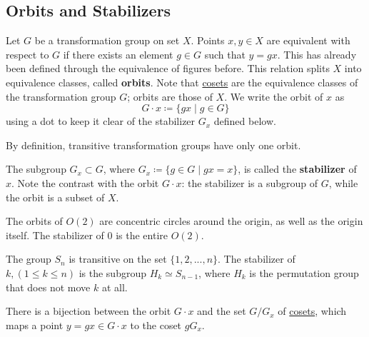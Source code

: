 \subsection{Orbits and Stabilizers}

  \begin{definition}[Orbits]
    \label{def:orbits}
    Let $G$ be a transformation group on set $X$. Points $x, y \in X$ are equivalent with respect to $G$ if there exists an element $g \in G$ such that $y = g x$. This has already been defined through the equivalence of figures before. This relation splits $X$ into equivalence classes, called \textbf{orbits}. Note that \hyperref[def:coset]{cosets} are the equivalence classes of the transformation group $G$; orbits are those of $X$. We write the orbit of $x$ as
    \begin{equation}
      G \cdot x \coloneqq \{ g x \;|\; g \in G \}
    \end{equation}
    using a dot to keep it clear of the stabilizer $G_x$ defined below.
  \end{definition}

  By definition, transitive transformation groups have only one orbit.

  \begin{definition}[Stabilizer]
    \label{def:stabilizer}
    The subgroup $G_{x} \subset G$, where $G_{x} \coloneqq \{ g \in G \mid g x = x\}$, is called the \textbf{stabilizer} of $x$. Note the contrast with the orbit $G \cdot x$: the stabilizer is a subgroup of $G$, while the orbit is a subset of $X$.
  \end{definition}

  \begin{example}[Orbits of $O(2)$]
    \label{ex:orbits-of-o2}
    The orbits of $O(2)$ are concentric circles around the origin, as well as the origin itself. The stabilizer of $0$ is the entire $O(2)$.
  \end{example}

  \begin{example}
    \label{ex:transitivity-and-stabilizers-of-sn}
    The group $S_n$ is transitive on the set $\{1, 2, ..., n\}$. The stabilizer of $k, (1 \leq k \leq n)$ is the subgroup $H_{k} \simeq S_{n-1}$, where $H_k$ is the permutation group that does not move $k$ at all. 
  \end{example}

  \begin{theorem}
    \label{thm:orbit-coset-correspondence}
    There is a bijection between the orbit $G \cdot x$ and the set $G / G_{x}$ of \hyperref[def:coset]{cosets}, which maps a point $y = g x \in G \cdot x$ to the coset $g G_x$. 
  \end{theorem}


